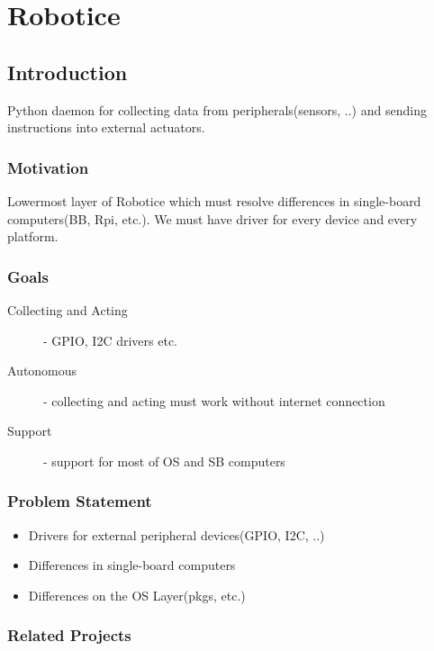 

\chapter{Robotice}

\section{Introduction}

Python daemon for collecting data from peripherals(sensors, ..) and sending instructions into external actuators.

\subsection{Motivation}

Lowermost layer of Robotice which must resolve differences in single-board computers(BB, Rpi, etc.). We must have driver for every device and every platform.

\subsection{Goals}

\begin{description}

\item[Collecting and Acting] - GPIO, I2C drivers etc.
\item[Autonomous] - collecting and acting must work without internet connection
\item[Support] - support for most of OS and SB computers

\end{description}

\subsection{Problem Statement}

\begin{itemize}

\item{Drivers for external peripheral devices(GPIO, I2C, ..)}
\item{Differences in single-board computers}
\item{Differences on the OS Layer(pkgs, etc.)}

\end{itemize}

\subsection{Related Projects}

